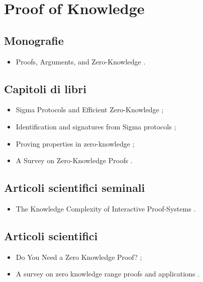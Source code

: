 \section*{Proof of Knowledge}

\subsection*{Monografie}
\begin{itemize}

\item Proofs, Arguments, and Zero-Knowledge \cite{thaler2022pokbook}.

\end{itemize}

\subsection*{Capitoli di libri}
\begin{itemize}

\item Sigma Protocols and Efficient Zero-Knowledge \cite{hazay2010sigmazero};

\item Identification and signatures from Sigma protocols \cite{boneh2023sigma};

\item Proving properties in zero-knowledge \cite{boneh2023zero};

\item A Survey on Zero-Knowledge Proofs \cite{li2014zero}.

\end{itemize}

\subsection*{Articoli scientifici seminali}
\begin{itemize}

\item The Knowledge Complexity of Interactive Proof-Systems \cite{goldwasser1985pok}.

\end{itemize}

\subsection*{Articoli scientifici}
\begin{itemize}

\item Do You Need a Zero Knowledge Proof? \cite{ernstberger2024zeroneed};

\item A survey on zero knowledge range proofs and applications \cite{morais2019zero}.

\end{itemize}

